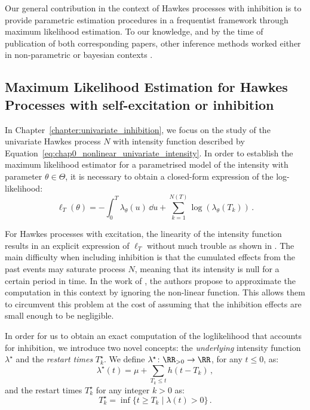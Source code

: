     Our general contribution in the context of Hawkes processes with inhibition is to provide parametric estimation procedures in a frequentist framework through maximum likelihood estimation.
    To our knowledge, and by the time of publication of both corresponding papers, other inference methods worked either in non-parametric \parencite{Reynaud2014,Bacry2016} or bayesian contexts \parencite{Rasmussen2013, Donnet2020, Sulem2021, Deutsch2022}.

    \subsection{Maximum Likelihood Estimation for Hawkes Processes with self-excitation or inhibition}
    
    In Chapter~\ref{chapter:univariate_inhibition}, we focus on the study of the univariate Hawkes process $N$ with intensity function described by Equation~\eqref{eq:chap0_nonlinear_univariate_intensity}.
    In order to establish the maximum likelihood estimator for a parametrised model of the intensity with parameter $\theta\in\Theta$, 
    it is necessary to obtain a closed-form expression of the log-likelihood:
    \[\ell_T(\theta) = - \int_{0}^{T}{\lambda_\theta(u)\,\dd u} + \sum_{k=1}^{N(T)}{\log(\lambda_\theta(T_k))}\,.\]
    
    For Hawkes processes with excitation, the linearity of the intensity function results in an explicit expression of $\ell_T$ without much trouble as shown in \textcite{Ozaki1979}.
    The main difficulty when including inhibition is that the cumulated effects from the past events may saturate process $N$, meaning that its intensity is null for a certain period in time.
    In the work of \textcite{Lemonnier2014}, the authors propose to approximate the computation in this context by ignoring the non-linear function.
    This allows them to circumvent this problem at the cost of assuming that the inhibition effects are small enough to be negligible.

    In order for us to obtain an exact computation of the loglikelihood that accounts for inhibition, we introduce two novel concepts: the \emph{underlying} intensity function $\lambda^\star$ and the \emph{restart times} $T_k^\star$.
    We define $\lambda^\star\colon \RR_{>0}\to \RR$, for any $t\leq 0$, as:
    \[\lambda^\star(t) = \mu + \sum_{T_k \leq t}{h(t-T_k)}\,,\]
    and the restart times $T_k^\star$ for any integer $k>0$ as:
    \[T_k^\star = \inf\{t\geq T_k \mid \lambda(t) > 0\}\,.\]

